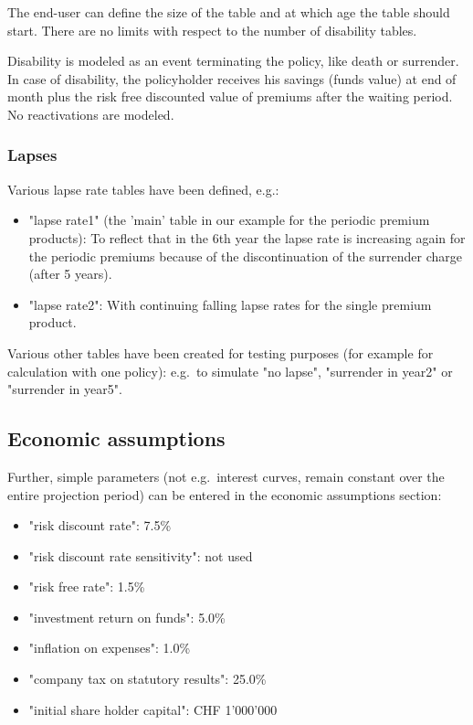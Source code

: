 The end-user can define the size of the table and at which age the table should start. There are no limits with respect to the number of disability tables.

Disability is modeled as an event terminating the policy, like death or surrender. In case of disability, the policyholder receives his savings (funds value) at end of month plus the risk free discounted value of premiums after the waiting period. No reactivations are modeled.

\subsubsection{Lapses}

Various lapse rate tables have been defined, e.g.:
\begin{itemize}
	\item "lapse rate1" (the 'main' table in our example for the periodic premium products): To reflect that in the 6th year the lapse rate is increasing again for the periodic premiums because of the discontinuation of the surrender charge (after 5 years).
	\item "lapse rate2": With continuing falling lapse rates for the single premium product.
\end{itemize}
Various other tables have been created for testing purposes (for example for calculation with one policy): e.g.~to simulate "no lapse", "surrender in year2" or "surrender in year5".

\subsection{Economic assumptions}

Further, simple parameters (not e.g.~interest curves, remain constant over the entire projection period) can be entered in the economic assumptions section:
\begin{itemize}
	\item "risk discount rate": 7.5\%
\item "risk discount rate sensitivity": not used
\item "risk free rate": 1.5\%
\item "investment return on funds": 5.0\%
\item "inflation on expenses": 1.0\%
\item "company tax on statutory results": 25.0\%
\item "initial share holder capital": CHF 1'000'000
\end{itemize}

